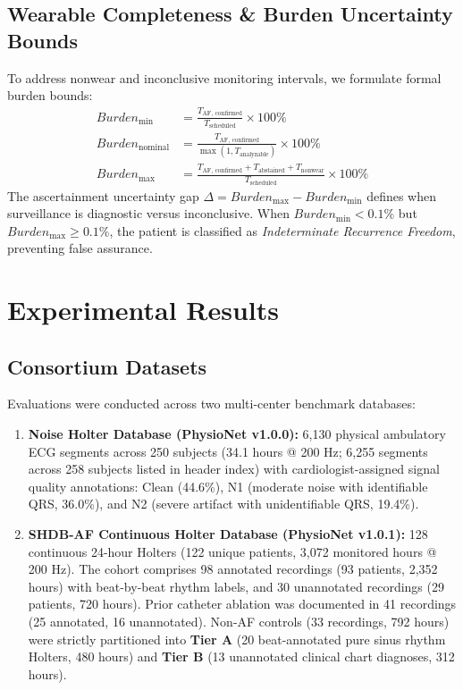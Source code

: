 \documentclass[10pt,twocolumn,letterpaper]{article}
\begin{document}
\subsection{Wearable Completeness \& Burden Uncertainty Bounds}
To address nonwear and inconclusive monitoring intervals, we formulate formal burden bounds:
\begin{align}
Burden_{\min} &= \frac{T_{\text{AF, confirmed}}}{T_{\text{scheduled}}} \times 100\% \\
Burden_{\text{nominal}} &= \frac{T_{\text{AF, confirmed}}}{\max(1, T_{\text{analyzable}})} \times 100\% \\
Burden_{\max} &= \frac{T_{\text{AF, confirmed}} + T_{\text{abstained}} + T_{\text{nonwear}}}{T_{\text{scheduled}}} \times 100\%
\end{align}
The ascertainment uncertainty gap $\Delta = Burden_{\max} - Burden_{\min}$ defines when surveillance is diagnostic versus inconclusive. When $Burden_{\min} < 0.1\%$ but $Burden_{\max} \ge 0.1\%$, the patient is classified as \emph{Indeterminate Recurrence Freedom}, preventing false assurance.

\section{Experimental Results}

\subsection{Consortium Datasets}
Evaluations were conducted across two multi-center benchmark databases:
\begin{enumerate}
    \item \textbf{Noise Holter Database (PhysioNet v1.0.0):} 6,130 physical ambulatory ECG segments across 250 subjects (34.1 hours @ 200 Hz; 6,255 segments across 258 subjects listed in header index) with cardiologist-assigned signal quality annotations: Clean (44.6\%), N1 (moderate noise with identifiable QRS, 36.0\%), and N2 (severe artifact with unidentifiable QRS, 19.4\%).
    \item \textbf{SHDB-AF Continuous Holter Database (PhysioNet v1.0.1):} 128 continuous 24-hour Holters (122 unique patients, 3,072 monitored hours @ 200 Hz). The cohort comprises 98 annotated recordings (93 patients, 2,352 hours) with beat-by-beat rhythm labels, and 30 unannotated recordings (29 patients, 720 hours). Prior catheter ablation was documented in 41 recordings (25 annotated, 16 unannotated). Non-AF controls (33 recordings, 792 hours) were strictly partitioned into \textbf{Tier A} (20 beat-annotated pure sinus rhythm Holters, 480 hours) and \textbf{Tier B} (13 unannotated clinical chart diagnoses, 312 hours).
\end{enumerate}
\end{document}
